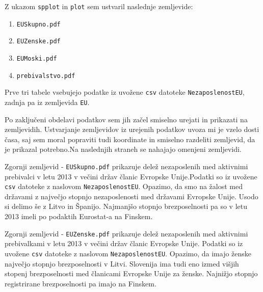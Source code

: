 \documentclass[11pt,a4paper]{article}
\begin{document}
Z ukazom \verb|spplot| in \verb|plot| sem ustvaril naslednje zemljevide: 
\begin{enumerate} 
\item{\verb|EUSkupno.pdf|}

\item{\verb|EUZenske.pdf|}

\item{\verb|EUMoski.pdf|}

\item{\verb|prebivalstvo.pdf|}
\end{enumerate}

Prve tri tabele vsebujejo podatke iz uvožene \verb|csv| datoteke \texttt{Ne\-za\-pos\-le\-nost\-EU}, zadnja pa iz zemljevida \verb|EU|. 

Po zaključeni obdelavi podatkov sem jih začel smiselno urejati in prikazati na zemljevidih. Ustvarjanje zemljevidov iz urejenih podatkov uvoza mi je vzelo dosti časa, saj sem moral popraviti tudi koordinate in smiselno razdeliti zemljevid, da je prikazal potrebno.Na naslednjih straneh se nahajajo omenjeni zemljevidi. 


Zgornji zemljevid - \verb|EUSkupno.pdf| prikazuje delež nezaposlenih med aktivnimi prebivalci v letu 2013 v večini držav članic Evropske Unije.Podatki so iz uvožene \verb|csv| datoteke z naslovom \verb|NezaposlenostEU|. Opazimo, da smo na žalost med državami z največjo stopnjo nezaposlenosti med državami Evropske Unije. Usodo si delimo še z Litvo in Španijo. Najmanjšo stopnjo brezposelnosti pa so v letu 2013 imeli po podaktih Eurostat-a na Finskem.


Zgornji zemljevid - \verb|EUZenske.pdf| prikazuje delež nezaposlenih med aktivnimi prebivalkami v letu 2013 v večini držav članic Evropske Unije. Podatki so iz uvožene \verb|csv| datoteke z naslovom \verb|NezaposlenostEU|. Opazimo, da imajo ženske največjo stopnjo brezposelnosti v Litvi. Slovenija ima tudi eno izmed višjih stopenj brezposelnosti med članicami Evropske Unije za ženske. Najnižjo stopnjo registrirane brezposelnosti pa imajo na Finskem.

\end{document}
